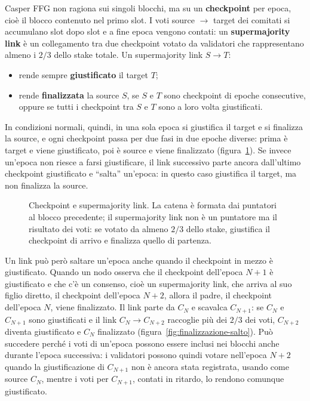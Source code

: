 \documentclass[a4paper, 11pt, oneside]{book}
\begin{document}
	Casper FFG non ragiona sui singoli blocchi, ma su un \textbf{checkpoint} per epoca,
	cioè il blocco contenuto nel primo slot. I voti source $\rightarrow$ target dei
	comitati si accumulano slot dopo slot e a fine epoca vengono contati: un
	\textbf{supermajority link} è un collegamento tra due checkpoint votato da validatori
	che rappresentano almeno i $2/3$ dello stake totale. Un supermajority link
	$S \rightarrow T$:
	\begin{itemize}
		\item rende sempre \textbf{giustificato} il target $T$;
		\item rende \textbf{finalizzata} la source $S$, se $S$ e $T$ sono checkpoint di
			epoche consecutive, oppure se tutti i checkpoint tra $S$ e $T$ sono a loro
			volta giustificati.
	\end{itemize}
	In condizioni normali, quindi, in una sola epoca si giustifica il target e si
	finalizza la source, e ogni checkpoint passa per due fasi in due epoche diverse:
	prima è target e viene giustificato, poi è source e viene finalizzato
	(figura~\ref{fig:checkpoint}). Se invece un'epoca non riesce a farsi giustificare, il
	link successivo parte ancora dall'ultimo checkpoint giustificato e ``salta''
	un'epoca: in questo caso giustifica il target, ma non finalizza la source.

	\begin{figure}[H]
		\centering
		
		\caption{Checkpoint e supermajority link. La catena è formata dai puntatori al
			blocco precedente; il supermajority link non è un puntatore ma il risultato dei
			voti: se votato da almeno $2/3$ dello stake, giustifica il checkpoint di arrivo
			e finalizza quello di partenza.}
		\label{fig:checkpoint}
	\end{figure}

	Un link può però saltare un'epoca anche quando il checkpoint in mezzo è
	giustificato. Quando un nodo osserva che il checkpoint dell'epoca $N+1$ è
	giustificato e che c'è un consenso, cioè un supermajority link, che arriva al suo
	figlio diretto, il checkpoint dell'epoca $N+2$, allora il padre, il checkpoint
	dell'epoca $N$, viene finalizzato. Il link parte da $C_N$ e scavalca $C_{N+1}$: se
	$C_N$ e $C_{N+1}$ sono giustificati e il link $C_N \rightarrow C_{N+2}$ raccoglie più
	dei $2/3$ dei voti, $C_{N+2}$ diventa giustificato e $C_N$ finalizzato
	(figura~\ref{fig:finalizzazione-salto}). Può
	succedere perché i voti di un'epoca possono essere inclusi nei blocchi anche durante
	l'epoca successiva: i validatori possono quindi votare nell'epoca $N+2$ quando la
	giustificazione di $C_{N+1}$ non è ancora stata registrata, usando come source
	$C_N$, mentre i voti per $C_{N+1}$, contati in ritardo, lo rendono comunque
	giustificato.
\end{document}
